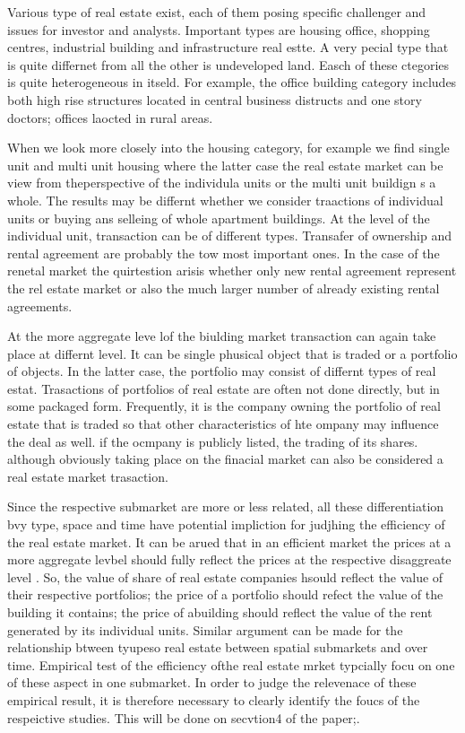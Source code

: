 \documentclass[AEJ,reqno, draftmode]{AEA}
\begin{document}
Various type of real estate exist, each of them posing specific challenger and issues for investor and analysts. Important types are housing office, shopping centres, industrial building and infrastructure real estte. A very pecial type that is quite differnet from all the other is undeveloped land. Easch of these ctegories is quite heterogeneous in itseld. For example, the office building category includes both high rise structures located in central business distructs and one story doctors; offices laocted in rural areas.

When we look more closely into the housing category, for example we find single unit and multi unit housing where the latter case the real estate market can be view from theperspective of the individula units or the multi unit buildign s a whole. The results may be differnt whether we consider traactions of individual units or buying ans selleing of whole apartment buildings. At the level of the individual unit, transaction can be of different types. Transafer of ownership and rental agreement are probably the tow most important ones. In the case of the renetal market the quirtestion arisis whether only new rental agreement represent the rel estate market or also the much larger number of already existing rental agreements.

At the more aggregate leve lof the biulding market transaction can again take place at differnt level. It can be single phusical object that is traded or a portfolio of objects. In the latter case, the portfolio may consist of differnt types of real estat. Trasactions of portfolios of real estate are often not done directly, but in some packaged form. Frequently, it is the company owning the portfolio of real estate that is traded so that other characteristics of hte ompany may influence the deal as well. if the ocmpany is publicly listed, the trading of its shares. although obviously taking place on the finacial market can also be considered a real estate market trasaction.

Since the respective submarket are more or less related, all these differentiation bvy type, space and time have potential impliction for judjhing the efficiency of the real estate market. It can be arued that in an efficient market the prices at a more aggregate levbel should fully reflect the prices at the respective disaggreate level . So, the value of share of real estate companies hsould reflect the value of their respective portfolios; the price of a portfolio should refect the value of the building it contains; the price of abuilding should reflect the value of the rent generated by its individual units. Similar argument can be made for the relationship btween tyupeso real estate between spatial submarkets and over time. Empirical test of the efficiency ofthe real estate mrket typcially focu on one of these aspect in one submarket. In order to judge the relevenace of these empirical result, it is therefore necessary to clearly identify the foucs of the respeictive studies. This will be done on secvtion4 of the paper;.
\end{document}

